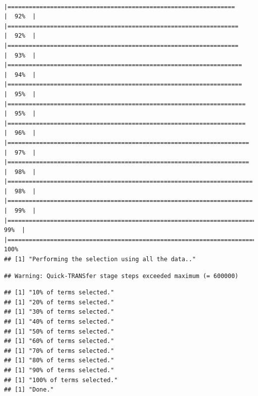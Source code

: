 \documentclass[
]{article}
\begin{document}
\begin{verbatim}
          |================================================================      |  92%  |                                                                              |=================================================================     |  92%  |                                                                              |=================================================================     |  93%  |                                                                              |==================================================================    |  94%  |                                                                              |==================================================================    |  95%  |                                                                              |===================================================================   |  95%  |                                                                              |===================================================================   |  96%  |                                                                              |====================================================================  |  97%  |                                                                              |====================================================================  |  98%  |                                                                              |===================================================================== |  98%  |                                                                              |===================================================================== |  99%  |                                                                              |======================================================================|  99%  |                                                                              |======================================================================| 100%
## [1] "Performing the selection using all the data.."
\end{verbatim}

\begin{verbatim}
## Warning: Quick-TRANSfer stage steps exceeded maximum (= 600000)
\end{verbatim}

\begin{verbatim}
## [1] "10% of terms selected."
## [1] "20% of terms selected."
## [1] "30% of terms selected."
## [1] "40% of terms selected."
## [1] "50% of terms selected."
## [1] "60% of terms selected."
## [1] "70% of terms selected."
## [1] "80% of terms selected."
## [1] "90% of terms selected."
## [1] "100% of terms selected."
## [1] "Done."
\end{verbatim}
\end{document}
